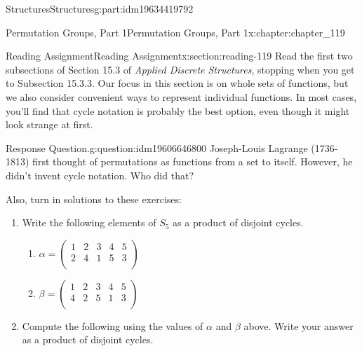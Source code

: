 \documentclass[oneside,10pt,]{book}
\numberwithin{equation}{section}
\begin{document}
\begin{partptx}{Structures}{}{Structures}{}{}{g:part:idm19634419792}
%
\typeout{************************************************}
\typeout{************************************************}
%
\begin{chapterptx}{Permutation Groups, Part 1}{}{Permutation Groups, Part 1}{}{}{x:chapter:chapter_119}
\index{}%
%
%
\typeout{************************************************}
\typeout{************************************************}
%
\begin{sectionptx}{Reading Assignment}{}{Reading Assignment}{}{}{x:section:reading-119}
Read the first two subsections of Section 15.3 of \emph{Applied Discrete Structures}, stopping when you get to  Subsection 15.3.3. Our focus in this section is on whole sets of functions, but we also consider convenient ways to represent individual functions.  In most cases, you'll find that cycle notation is probably the best option, even though it might look strange at first.%
\begin{question}{Response Question.}{g:question:idm19606646800}%
Joseph-Louis Lagrange (1736-1813) first thought of permutations as functions from a set to itself. However, he didn't invent cycle notation.  Who did that?%
\end{question}
Also, turn in solutions to these exercises:%
\begin{enumerate}[label=\arabic*]
\item{}Write the following elements of \(S_5\) as a product of disjoint cycles.%
\begin{multicols}{2}
\begin{enumerate}[label=(\alph*)]
\item{}\(\displaystyle \alpha=\left(
\begin{array}{ccccc}
1 & 2 & 3 & 4 & 5 \\
2 & 4 & 1 & 5 & 3 \\
\end{array}
\right)\)%
\item{}\(\displaystyle \beta=\left(
\begin{array}{ccccc}
1 & 2 & 3 & 4 & 5 \\
4 & 2 & 5 & 1 & 3 \\
\end{array}
\right)\)%
\end{enumerate}
\end{multicols}
%
\item{}Compute the following using the values of \(\alpha\) and \(\beta\) above.  Write your answer as a product of disjoint cycles.%

\end{enumerate}
\end{sectionptx}
\end{chapterptx}
\end{partptx}
\end{document}
